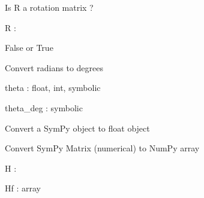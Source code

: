 \documentclass[letterpaper,10pt,english]{sphinxmanual}
\begin{document}

\begin{fulllineitems}
\label{\detokenize{_src/didactic:rkd.didactic.util.isrot}}
Is R a rotation matrix ?

R : 

False or True

\end{fulllineitems}


\begin{fulllineitems}
\label{\detokenize{_src/didactic:rkd.didactic.util.rad2deg}}
Convert radians to degrees

theta : float, int, symbolic

theta\_deg : symbolic

\end{fulllineitems}


\begin{fulllineitems}
\label{\detokenize{_src/didactic:rkd.didactic.util.sympy2float}}
Convert a SymPy object to float object

\end{fulllineitems}


\begin{fulllineitems}
\label{\detokenize{_src/didactic:rkd.didactic.util.sympy_matrix_to_numpy_float}}
Convert SymPy Matrix (numerical) to NumPy array

H : 

Hf : array

\end{fulllineitems}
\end{document}
